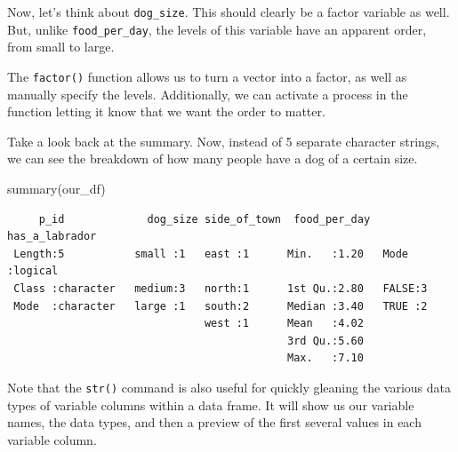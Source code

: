 \documentclass[
  letterpaper,
  DIV=11,
  numbers=noendperiod]{scrreprt}
\newenvironment{Shaded}{\begin{snugshade}}{\end{snugshade}}
\newcommand{\AttributeTok}[1]{\textcolor[rgb]{0.40,0.45,0.13}{#1}}
\newcommand{\ConstantTok}[1]{\textcolor[rgb]{0.56,0.35,0.01}{#1}}
\newcommand{\FunctionTok}[1]{\textcolor[rgb]{0.28,0.35,0.67}{#1}}
\newcommand{\NormalTok}[1]{\textcolor[rgb]{0.00,0.23,0.31}{#1}}
\newcommand{\OtherTok}[1]{\textcolor[rgb]{0.00,0.23,0.31}{#1}}
\newcommand{\SpecialCharTok}[1]{\textcolor[rgb]{0.37,0.37,0.37}{#1}}
\newcommand{\StringTok}[1]{\textcolor[rgb]{0.13,0.47,0.30}{#1}}
\begin{document}
Now, let's think about \texttt{dog\_size}. This should clearly be a
factor variable as well. But, unlike \texttt{food\_per\_day}, the levels
of this variable have an apparent order, from small to large.

The \texttt{factor()} function allows us to turn a vector into a factor,
as well as manually specify the levels. Additionally, we can activate a
process in the function letting it know that we want the order to
matter.

\begin{Shaded}
\end{Shaded}

Take a look back at the summary. Now, instead of 5 separate character
strings, we can see the breakdown of how many people have a dog of a
certain size.

\begin{Shaded}
\begin{Highlighting}[]
\FunctionTok{summary}\NormalTok{(our\_df)}
\end{Highlighting}
\end{Shaded}

\begin{verbatim}
     p_id             dog_size side_of_town  food_per_day  has_a_labrador 
 Length:5           small :1   east :1      Min.   :1.20   Mode :logical  
 Class :character   medium:3   north:1      1st Qu.:2.80   FALSE:3        
 Mode  :character   large :1   south:2      Median :3.40   TRUE :2        
                               west :1      Mean   :4.02                  
                                            3rd Qu.:5.60                  
                                            Max.   :7.10                  
\end{verbatim}

Note that the \texttt{str()} command is also useful for quickly gleaning
the various data types of variable columns within a data frame. It will
show us our variable names, the data types, and then a preview of the
first several values in each variable column.
\end{document}
